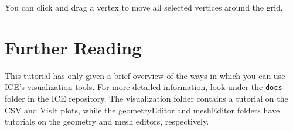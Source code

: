You can click and drag a vertex to move all selected vertices around the grid.

\section{Further Reading}

This tutorial has only given a brief overview of the ways in which you can use
ICE's visualization tools. For more detailed information, look under the
\texttt{docs} folder in the ICE repository. The visualization folder contains a
tutorial on the CSV and VisIt plots, while the geometryEditor and meshEditor
folders have tutorials on the geometry and mesh editors, respectively. 